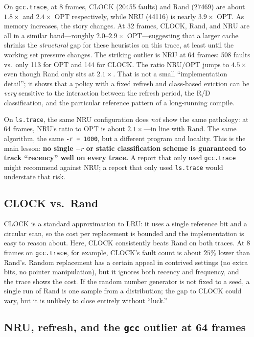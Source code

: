 \documentclass[11pt]{article}
\begin{document}
On \texttt{gcc.trace}, at \num{8} frames, CLOCK (\num{20455} faults) and Rand (\num{27469}) are about $1.8\times$ and $2.4\times$ OPT respectively, while NRU (\num{44116}) is nearly $3.9\times$ OPT. As memory increases, the story changes. At \num{32} frames, CLOCK, Rand, and NRU are all in a similar band---roughly $2.0$--$2.9\times$ OPT---suggesting that a larger cache shrinks the \emph{structural} gap for these heuristics on this trace, at least until the working set pressure changes. The striking outlier is NRU at \num{64} frames: \num{508} faults vs.\ only \num{113} for OPT and \num{144} for CLOCK. The ratio NRU/OPT jumps to $4.5\times$ even though Rand only sits at $2.1\times$. That is not a small ``implementation detail''; it shows that a policy with a fixed refresh and class-based eviction can be \emph{very} sensitive to the interaction between the refresh period, the R/D classification, and the particular reference pattern of a long-running compile.

On \texttt{ls.trace}, the same NRU configuration does \emph{not} show the same pathology: at \num{64} frames, NRU's ratio to OPT is about $2.1\times$---in line with Rand. The same algorithm, the same \texttt{-r = 1000}, but a different program and locality. This is the main lesson: \textbf{no single} $-r$ \textbf{or static classification scheme is guaranteed to track ``recency'' well on every trace.} A report that only used \texttt{gcc.trace} might recommend against NRU; a report that only used \texttt{ls.trace} would understate that risk.

\subsection{CLOCK vs.\ Rand}

CLOCK is a standard approximation to LRU: it uses a single reference bit and a circular scan, so the cost per replacement is bounded and the implementation is easy to reason about. Here, CLOCK consistently beats Rand on both traces. At \num{8} frames on \texttt{gcc.trace}, for example, CLOCK's fault count is about $25\%$ lower than Rand's. Random replacement has a certain appeal in contrived settings (no extra bits, no pointer manipulation), but it ignores both recency and frequency, and the trace shows the cost. If the random number generator is not fixed to a seed, a single run of Rand is one sample from a distribution; the gap to CLOCK could vary, but it is unlikely to close entirely without ``luck.''

\subsection{NRU, refresh, and the \texttt{gcc} outlier at \num{64} frames}
\end{document}

